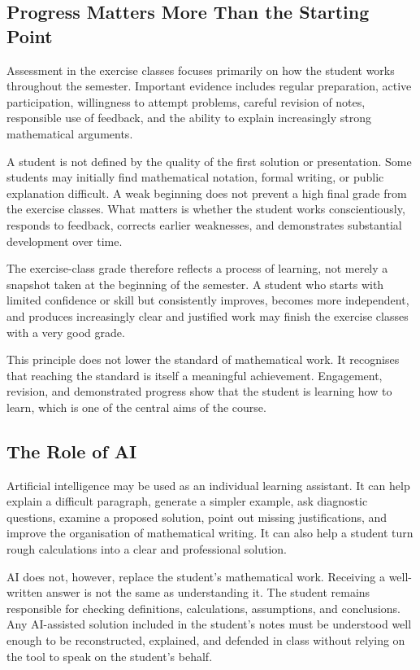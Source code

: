 \subsection{Progress Matters More Than the Starting Point}

Assessment in the exercise classes focuses primarily on how the student works
throughout the semester. Important evidence includes regular preparation,
active participation, willingness to attempt problems, careful revision of
notes, responsible use of feedback, and the ability to explain increasingly
strong mathematical arguments.

A student is not defined by the quality of the first solution or presentation.
Some students may initially find mathematical notation, formal writing, or
public explanation difficult. A weak beginning does not prevent a high final
grade from the exercise classes. What matters is whether the student works
conscientiously, responds to feedback, corrects earlier weaknesses, and
demonstrates substantial development over time.

The exercise-class grade therefore reflects a process of learning, not merely a
snapshot taken at the beginning of the semester. A student who starts with
limited confidence or skill but consistently improves, becomes more independent,
and produces increasingly clear and justified work may finish the exercise
classes with a very good grade.

This principle does not lower the standard of mathematical work. It recognises
that reaching the standard is itself a meaningful achievement. Engagement,
revision, and demonstrated progress show that the student is learning how to
learn, which is one of the central aims of the course.

\subsection{The Role of AI}

Artificial intelligence may be used as an individual learning assistant. It can
help explain a difficult paragraph, generate a simpler example, ask diagnostic
questions, examine a proposed solution, point out missing justifications, and
improve the organisation of mathematical writing. It can also help a student
turn rough calculations into a clear and professional solution.

AI does not, however, replace the student's mathematical work. Receiving a
well-written answer is not the same as understanding it. The student remains
responsible for checking definitions, calculations, assumptions, and
conclusions. Any AI-assisted solution included in the student's notes must be
understood well enough to be reconstructed, explained, and defended in class
without relying on the tool to speak on the student's behalf.

